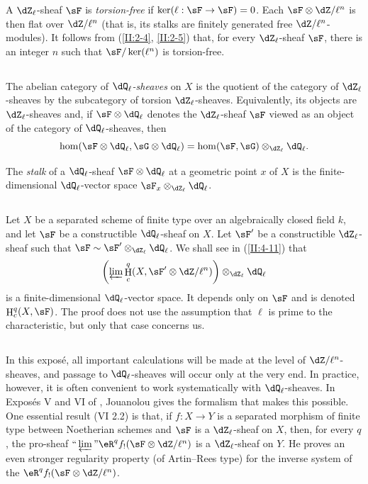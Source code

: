 \documentclass[12pt,oneside,english]{smfbook}
\DeclareMathOperator{\h}{H}
\newcounter{char}
\begin{document}
A $\dZ_\ell$-sheaf $\sF$ is \emph{torsion-free} if $\ker(\ell:\sF\to\sF)=0$. Each $\sF\otimes\dZ/\ell^n$ is then flat over $\dZ/\ell^n$ (that is, its stalks are finitely generated free $\dZ/\ell^n$-modules). It follows from (\ref{II:2-4}, \ref{II:2-5}) that, for every $\dZ_\ell$-sheaf $\sF$, there is an integer $n$ such that $\sF/\ker(\ell^n)$ is torsion-free.

\subsection{}\label{II:2-9}

The abelian category of \emph{$\dQ_\ell$-sheaves} on $X$ is the quotient of the category of $\dZ_\ell$-sheaves by the subcategory of torsion $\dZ_\ell$-sheaves. Equivalently, its objects are $\dZ_\ell$-sheaves and, if $\sF\otimes\dQ_\ell$ denotes the $\dZ_\ell$-sheaf $\sF$ viewed as an object of the category of $\dQ_\ell$-sheaves, then
\[
  \hom(\sF\otimes\dQ_\ell,\sG\otimes\dQ_\ell) = \hom(\sF,\sG)\otimes_{\dZ_\ell}\dQ_\ell \text{.}
\]

The \emph{stalk} of a $\dQ_\ell$-sheaf $\sF\otimes\dQ_\ell$ at a geometric point $x$ of $X$ is the finite-dimensional $\dQ_\ell$-vector space $\sF_x\otimes_{\dZ_\ell}\dQ_\ell$.

\subsection{}\label{II:2-10}

Let $X$ be a separated scheme of finite type over an algebraically closed field $k$, and let $\sF$ be a constructible $\dQ_\ell$-sheaf on $X$. Let $\sF'$ be a constructible $\dZ_\ell$-sheaf such that $\sF\sim\sF'\otimes_{\dZ_\ell}\dQ_\ell$. We shall see in (\ref{II:4-11}) that
\[
  \left(\varprojlim \h_c^q(X,\sF'\otimes \dZ/\ell^n)\right)\otimes_{\dZ_\ell}\dQ_\ell
\]
is a finite-dimensional $\dQ_\ell$-vector space. It depends only on $\sF$ and is denoted $\h_c^q(X,\sF)$. The proof does not use the assumption that $\ell$ is prime to the characteristic, but only that case concerns us.

\subsection{}\label{II:2-11}

In this exposé, all important calculations will be made at the level of $\dZ/\ell^n$-sheaves, and passage to $\dQ_\ell$-sheaves will occur only at the very end. In practice, however, it is often convenient to work systematically with $\dQ_\ell$-sheaves. In Exposés V and VI of \cite{sga5}, Jouanolou gives the formalism that makes this possible. One essential result (VI 2.2) is that, if $f:X\to Y$ is a separated morphism of finite type between Noetherian schemes and $\sF$ is a $\dZ_\ell$-sheaf on $X$, then, for every $q$, the pro-sheaf $\text{``}\varprojlim\text{''}\eR^qf_!(\sF\otimes\dZ/\ell^n)$ is a $\dZ_\ell$-sheaf on $Y$. He proves an even stronger regularity property (of Artin--Rees type) for the inverse system of the $\eR^qf_!(\sF\otimes\dZ/\ell^n)$.
\end{document}
